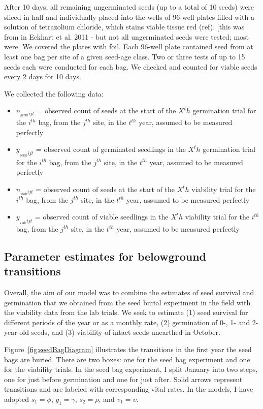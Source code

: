 \documentclass[12pt, oneside, titlepage]{article}   	%
\begin{document}
After 10 days, all remaining ungerminated seeds (up to a total of 10 seeds) were sliced in half and individually placed into the wells of 96-well plates filled with a solution of tetrazolium chloride, which stains viable tissue red (ref). [this was from in Eckhart et al. 2011 - but not all ungerminated seeds were tested; most were] We covered the plates with foil. Each 96-well plate contained seed from at least one bag per site of a given seed-age class. Two or three tests of up to 15 seeds each were conducted for each bag. We checked and counted for viable seeds every 2 days for 10 days. 

We collected the following data: 

\begin{itemize}
	\item $n_{_{\mathrm{germ}} ijt}$ = observed count of seeds at the start of the $X^th$ germination trial for the $i^{th}$ bag, from the $j^{th}$ site, in the $t^{th}$ year, assumed to be measured perfectly
	\item $y_{_{\mathrm{germ}} ijt}$ = observed count of germinated seedlings in the $X^th$ germination trial for the $i^{th}$ bag, from the $j^{th}$ site, in the $t^{th}$ year, assumed to be measured perfectly 
	\item $n_{_{\mathrm{viab}} ijt}$ = observed count of seeds at the start of the $X^th$ viability trial for the $i^{th}$ bag, from the $j^{th}$ site, in the $t^{th}$ year, assumed to be measured perfectly 
	\item $y_{_{\mathrm{viab}} ijt}$ = observed count of viable seedlings in the $X^th$ viability trial for the $i^{th}$ bag, from the $j^{th}$ site, in the $t^{th}$ year, assumed to be measured perfectly 
\end{itemize}

\subsection*{Parameter estimates for belowground transitions}

Overall, the aim of our model was to combine the estimates of seed survival and germination that we obtained from the seed burial experiment in the field with the viability data from the lab trials. We seek to estimate (1) seed survival for different periods of the year or as a monthly rate, (2) germination of 0-, 1- and 2-year old seeds, and (3) viability of intact seeds unearthed in October. 

Figure~\ref{fig:seedBagDiagram} illustrates the transitions in the first year the seed bags are buried. There are two boxes: one for the seed bag experiment and one for the viability trials. In the seed bag experiment, I split January into two steps, one for just before germination and one for just after. Solid arrows represent transitions and are labeled with corresponding vital rates. In the models, I have adopted $s_1 = \phi$, $g_1=\gamma$, $s_2 = \rho$, and $v_1 = \upsilon$. 
 
\end{document}

